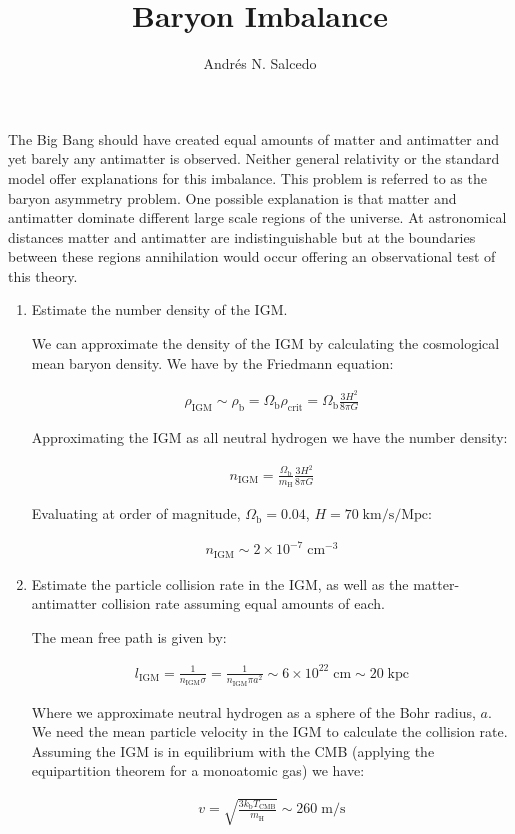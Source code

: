\documentclass{article}
\title{Baryon Imbalance}
\author{Andr\'{e}s N. Salcedo}
\def\Omb{\Omega_\mathrm{b}}
\def\rhob{\rho_\mathrm{b}}
\def\rhocrit{\rho_\mathrm{crit}}
\def\nIGM{n_\mathrm{IGM}}
\def\rhoIGM{\rho_\mathrm{IGM}}
\def\mh{m_\mathrm{H}}
\def\kmsMpc{\mathrm{km/s/Mpc}}
\def\beq{\begin{eqnarray}}
\def\eeq{\end{eqnarray}}
\begin{document}
\maketitle

The Big Bang should have created equal amounts of matter and antimatter and yet barely any antimatter is observed. Neither general relativity or the standard model offer explanations for this imbalance. This problem is referred to as the baryon asymmetry problem. One possible explanation is that matter and antimatter dominate different large scale regions of the universe. At astronomical distances matter and antimatter are indistinguishable but at the boundaries between these regions annihilation would occur offering an observational test of this theory. 

\begin{enumerate}

\item Estimate the number density of the IGM.

  We can approximate the density of the IGM by calculating the cosmological mean baryon density. We have by the Friedmann equation:

  \beq
  \rhoIGM \sim \rhob = \Omb \rhocrit = \Omb \frac{3 H^2}{8 \pi G}
  \eeq
  
  Approximating the IGM as all neutral hydrogen we have the number density:

  \beq
  \nIGM = \frac{\Omb}{\mh} \frac{3 H^2}{8 \pi G}
  \eeq
  
  Evaluating at order of magnitude, $\Omb = 0.04$, $H = 70 \; \kmsMpc$:

  \beq
  \nIGM \sim 2 \times 10^{-7} \; \mathrm{cm^{-3}}
  \eeq

\item Estimate the particle collision rate in the IGM, as well as the matter-antimatter collision rate assuming equal amounts of each.

  The mean free path is given by:

  \beq
  \mathit{l_\mathrm{IGM}} = \frac{1}{\nIGM \sigma} = \frac{1}{\nIGM \pi a^2} \sim 6 \times 10^{22} \; \mathrm{cm} \sim 20 \; \mathrm{kpc}
  \eeq

  Where we approximate neutral hydrogen as a sphere of the Bohr radius, $a$. We need the mean particle velocity in the IGM to calculate the collision rate. Assuming the IGM is in equilibrium with the CMB (applying the equipartition theorem for a monoatomic gas) we have:

  \beq
  v = \sqrt{\frac{3 k_\mathrm{b} T_\mathrm{CMB}}{\mh}} \sim 260 \; \mathrm{m/s}
  \eeq


\end{enumerate}
\end{document}

